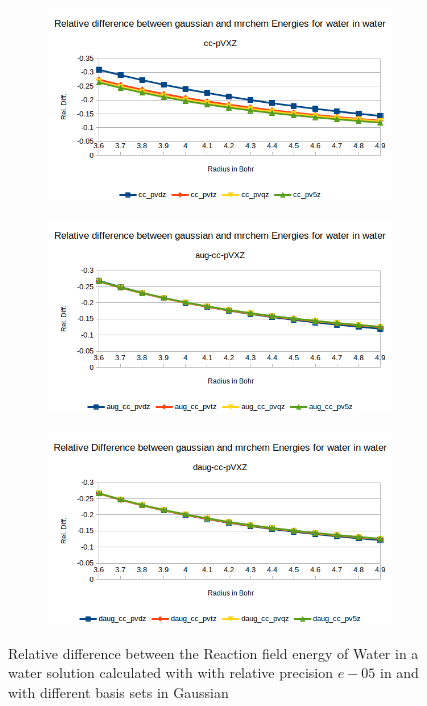 \documentclass[../master_thesis.tex]{subfiles}
\begin{document}
\begin{figure}[h!]
  \centering
  \begin{subfigure}[b]{0.75\linewidth}
    \includegraphics[width=\linewidth]{img/watreldiff.png}
  \end{subfigure}
  \begin{subfigure}[b]{0.75\linewidth}
    \includegraphics[width=\linewidth]{img/wataugreldiff.png}
  \end{subfigure}
  \begin{subfigure}[b]{0.75\linewidth}
    \includegraphics[width=\linewidth]{img/watdaugreldiff.png}
  \end{subfigure}
  \caption{Relative difference between the Reaction field energy of Water in a water solution calculated with with relative precision $e-05$ in \mrchem
   and with different basis sets in Gaussian}
  \label{fig:watreldiffvar}
\end{figure}
\end{document}
